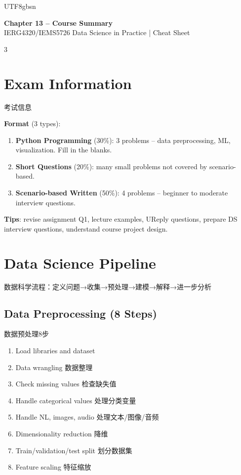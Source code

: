 \documentclass[9pt,landscape,a4paper]{article}
\newcommand{\zhint}[1]{{\scriptsize\color{gray!70!black}#1}}
\begin{document}
\begin{CJK}{UTF8}{gbsn}

\begin{center}
{\large\bfseries\color{blue!70!black} Chapter 13 -- Course Summary}\\
{\footnotesize IERG4320/IEMS5726 Data Science in Practice | Cheat Sheet}
\end{center}

\begin{multicols}{3}

\section{Exam Information}
\zhint{考试信息}

\textbf{Format} (3 types):
\begin{enumerate}[leftmargin=10pt,itemsep=0pt,topsep=0pt]
\item \textbf{Python Programming} (30\%): 3 problems -- data preprocessing, ML, visualization. Fill in the blanks.
\item \textbf{Short Questions} (20\%): many small problems not covered by scenario-based.
\item \textbf{Scenario-based Written} (50\%): 4 problems -- beginner to moderate interview questions.
\end{enumerate}

\textbf{Tips}: revise assignment Q1, lecture examples, UReply questions, prepare DS interview questions, understand course project design.

\section{Data Science Pipeline}
\zhint{数据科学流程：定义问题→收集→预处理→建模→解释→进一步分析}


\subsection{Data Preprocessing (8 Steps)}
\zhint{数据预处理8步}
\begin{enumerate}[leftmargin=10pt,itemsep=0pt,topsep=0pt]
\item Load libraries and dataset
\item Data wrangling \zhint{数据整理}
\item Check missing values \zhint{检查缺失值}
\item Handle categorical values \zhint{处理分类变量}
\item Handle NL, images, audio \zhint{处理文本/图像/音频}
\item Dimensionality reduction \zhint{降维}
\item Train/validation/test split \zhint{划分数据集}
\item Feature scaling \zhint{特征缩放}
\end{enumerate}


\end{multicols}
\end{CJK}
\end{document}
